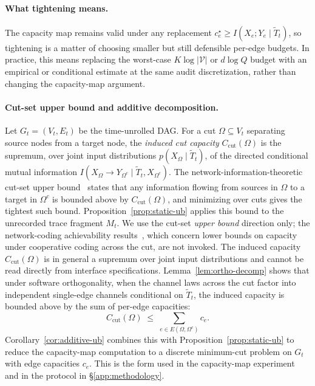 \documentclass{article}
\begin{document}
  \paragraph{What tightening means.}
  The capacity map remains valid under any replacement $c_e^\star \geq
  I(X_e; Y_e \mid \tilde T_t)$, so tightening is a matter of choosing smaller
  but still defensible per-edge budgets. In practice, this means replacing the
  worst-case $K \log |\mathcal{V}|$ or $d \log Q$ budget with an empirical or
  conditional estimate at the same audit discretization, rather than changing
  the capacity-map argument.

  \paragraph{Cut-set upper bound and additive decomposition.}
  Let $G_t = (V_t, E_t)$ be the time-unrolled DAG. For a cut $\Omega \subseteq
  V_t$ separating source nodes from a target node, the \emph{induced cut
  capacity} $C_\text{cut}(\Omega)$ is the supremum, over joint input
  distributions $p(X_\Omega \mid \tilde T_t)$, of the directed conditional
  mutual information $I(X_\Omega \to Y_{\Omega^c} \mid \tilde T_t,
  X_{\Omega^c})$. The network-information-theoretic cut-set upper
  bound~\citep{elgamal2011network} states that any information flowing from
  sources in $\Omega$ to a target in $\Omega^c$ is bounded above by
  $C_\text{cut}(\Omega)$, and minimizing over cuts gives the tightest such
  bound. Proposition~\ref{prop:static-ub} applies this bound to the unrecorded
  trace fragment $M_t$. We use the cut-set \emph{upper bound} direction only;
  the network-coding achievability results~\citep{ahlswede2000network}, which
  concern lower bounds on capacity under cooperative coding across the cut, are
  not invoked. The induced capacity $C_\text{cut}(\Omega)$ is in general a
  supremum over joint input distributions and cannot be read directly from
  interface specifications. Lemma~\ref{lem:ortho-decomp} shows that under
  software orthogonality, when the channel laws across the cut factor into
  independent single-edge channels conditional on $\tilde T_t$, the induced
  capacity is bounded above by the sum of per-edge capacities:
  \[
    C_\text{cut}(\Omega) \;\leq\; \sum_{e \in E(\Omega, \Omega^c)} c_e.
  \]
  Corollary~\ref{cor:additive-ub} combines this with
  Proposition~\ref{prop:static-ub} to reduce the capacity-map computation to a
  discrete minimum-cut problem on $G_t$ with edge capacities $c_e$. This is the
  form used in the capacity-map experiment and in the protocol in
  \S\ref{app:methodology}.
\end{document}
